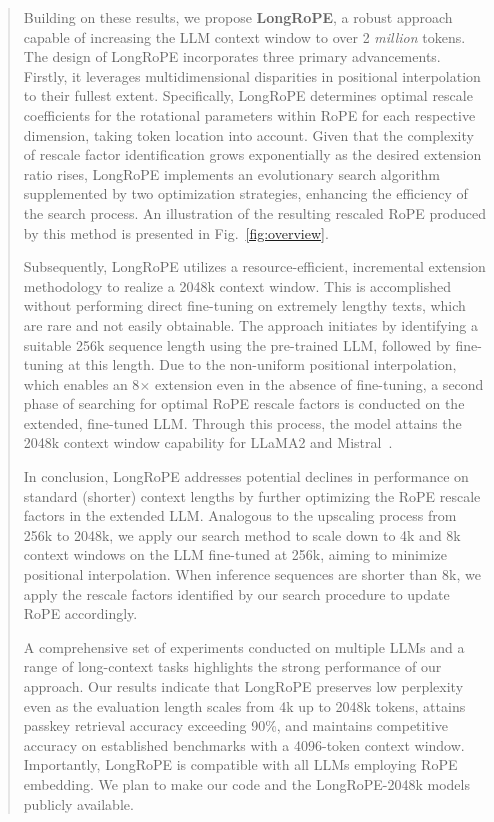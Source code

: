\begin{abstract}
Building on these results, we propose \textbf{LongRoPE}, a robust approach capable of increasing the LLM context window to over 2 \emph{million} tokens. The design of LongRoPE incorporates three primary advancements. Firstly, it leverages multidimensional disparities in positional interpolation to their fullest extent. Specifically, LongRoPE determines optimal rescale coefficients for the rotational parameters within RoPE for each respective dimension, taking token location into account. Given that the complexity of rescale factor identification grows exponentially as the desired extension ratio rises, LongRoPE implements an evolutionary search algorithm supplemented by two optimization strategies, enhancing the efficiency of the search process. An illustration of the resulting rescaled RoPE produced by this method is presented in Fig.~\ref{fig:overview}.

Subsequently, {LongRoPE} utilizes a resource-efficient, incremental extension methodology to realize a 2048k context window. This is accomplished without performing direct fine-tuning on extremely lengthy texts, which are rare and not easily obtainable. The approach initiates by identifying a suitable 256k sequence length using the pre-trained LLM, followed by fine-tuning at this length. Due to the non-uniform positional interpolation, which enables an 8$\times$ extension even in the absence of fine-tuning, a second phase of searching for optimal RoPE rescale factors is conducted on the extended, fine-tuned LLM. Through this process, the model attains the 2048k context window capability for LLaMA2 and Mistral~\cite{mistral}.

In conclusion, {LongRoPE} addresses potential declines in performance on standard (shorter) context lengths by further optimizing the RoPE rescale factors in the extended LLM. Analogous to the upscaling process from 256k to 2048k, we apply our search method to scale down to 4k and 8k context windows on the LLM fine-tuned at 256k, aiming to minimize positional interpolation. When inference sequences are shorter than 8k, we apply the rescale factors identified by our search procedure to update RoPE accordingly.

A comprehensive set of experiments conducted on multiple LLMs and a range of long-context tasks highlights the strong performance of our approach. Our results indicate that LongRoPE preserves low perplexity even as the evaluation length scales from 4k up to 2048k tokens, attains passkey retrieval accuracy exceeding 90\%, and maintains competitive accuracy on established benchmarks with a 4096-token context window. Importantly, LongRoPE is compatible with all LLMs employing RoPE embedding. We plan to make our code and the LongRoPE-2048k models publicly available.


\end{abstract}
